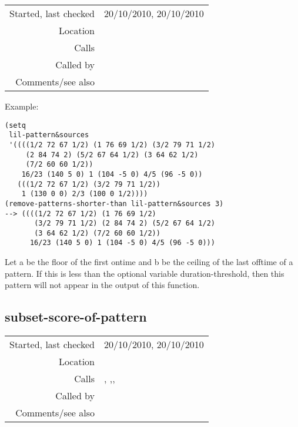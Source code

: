\vspace{0.3cm}
\begin{tabular}{r|p{8cm}}
Started, last checked & 20/10/2010, 20/10/2010 \\
Location & \nameref{sec:pattern-inheritance-preliminaries} \\
Calls & \\
Called by & \nameref{fun:prepare-for-pattern-inheritance} \\
Comments/see also & 
\end{tabular}

\vspace{0.5cm}
\noindent Example:
\begin{verbatim}
(setq
 lil-pattern&sources
 '((((1/2 72 67 1/2) (1 76 69 1/2) (3/2 79 71 1/2)
     (2 84 74 2) (5/2 67 64 1/2) (3 64 62 1/2)
     (7/2 60 60 1/2))
    16/23 (140 5 0) 1 (104 -5 0) 4/5 (96 -5 0))
   (((1/2 72 67 1/2) (3/2 79 71 1/2))
    1 (130 0 0) 2/3 (100 0 1/2))))
(remove-patterns-shorter-than lil-pattern&sources 3)
--> ((((1/2 72 67 1/2) (1 76 69 1/2)
       (3/2 79 71 1/2) (2 84 74 2) (5/2 67 64 1/2)
       (3 64 62 1/2) (7/2 60 60 1/2))
      16/23 (140 5 0) 1 (104 -5 0) 4/5 (96 -5 0)))
\end{verbatim}

\noindent Let a be the floor of the first ontime
and b be the ceiling of the last offtime of a
pattern. If this is less than the optional variable
duration-threshold, then this pattern will not
appear in the output of this function.


\subsection*{subset-score-of-pattern}\label{fun:subset-score-of-pattern}

\vspace{0.3cm}
\begin{tabular}{r|p{8cm}}
Started, last checked & 20/10/2010, 20/10/2010 \\
Location & \nameref{sec:pattern-inheritance-preliminaries} \\
Calls & \nameref{fun:fibonacci-list}, \nameref{fun:my-last},\newline \nameref{fun:subset-multidimensional}, \nameref{fun:translations} \\
Called by & \nameref{fun:subset-scores-of-patterns+} \\
Comments/see also & 
\end{tabular}

